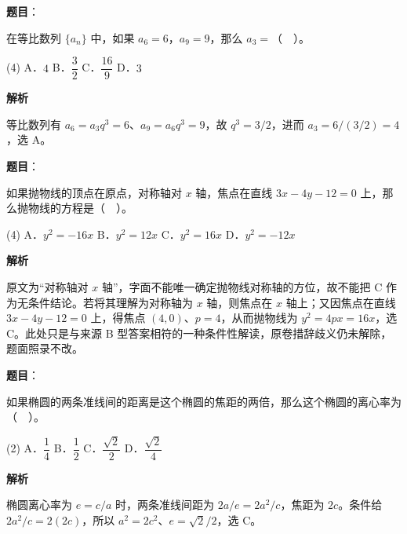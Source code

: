\begin{answer}

\textbf{题目}：

在等比数列 $\{a_n\}$ 中，如果 $a_6=6$，$a_9=9$，那么 $a_3=$（　）。

\begin{gkopts}(4)
\task A．$4$
\task B．$\dfrac32$
\task C．$\dfrac{16}9$
\task D．$3$
\end{gkopts}

\textbf{解析}

等比数列有 $a_6=a_3q^3=6$、$a_9=a_6q^3=9$，故 $q^3=3/2$，进而 $a_3=6/(3/2)=4$，选 A。


\end{answer}
\begin{answer}

\textbf{题目}：

如果抛物线的顶点在原点，对称轴对 $x$ 轴，焦点在直线 $3x-4y-12=0$ 上，那么抛物线的方程是（　）。

\begin{gkopts}(4)
\task A．$y^2=-16x$
\task B．$y^2=12x$
\task C．$y^2=16x$
\task D．$y^2=-12x$
\end{gkopts}

\textbf{解析}

原文为“对称轴对 $x$ 轴”，字面不能唯一确定抛物线对称轴的方位，故不能把 C 作为无条件结论。若将其理解为对称轴为 $x$ 轴，则焦点在 $x$ 轴上；又因焦点在直线 $3x-4y-12=0$ 上，得焦点 $(4,0)$、$p=4$，从而抛物线为 $y^2=4px=16x$，选 C。此处只是与来源 B 型答案相符的一种条件性解读，原卷措辞歧义仍未解除，题面照录不改。


\end{answer}
\begin{answer}

\textbf{题目}：

如果椭圆的两条准线间的距离是这个椭圆的焦距的两倍，那么这个椭圆的离心率为（　）。

\begin{gkopts}(2)
\task A．$\dfrac14$
\task B．$\dfrac12$
\task C．$\dfrac{\sqrt2}2$
\task D．$\dfrac{\sqrt2}4$
\end{gkopts}

\textbf{解析}

椭圆离心率为 $e=c/a$ 时，两条准线间距为 $2a/e=2a^2/c$，焦距为 $2c$。条件给 $2a^2/c=2(2c)$，所以 $a^2=2c^2$、$e=\sqrt2/2$，选 C。


\end{answer}
